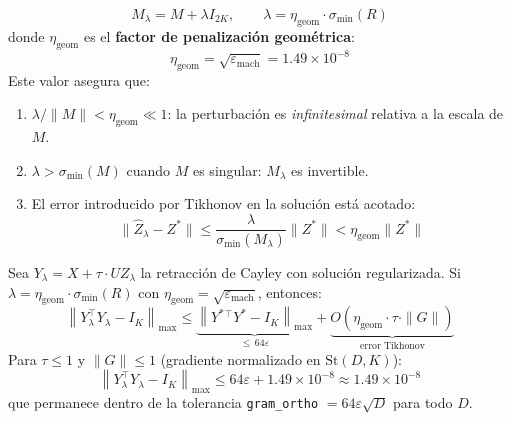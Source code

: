 \begin{equation}
  M_\lambda = M + \lambda I_{2K}, \qquad
  \lambda = \eta_{\text{geom}} \cdot \sigma_{\min}(R)
  
\end{equation}
donde $\eta_{\text{geom}}$ es el \textbf{factor de penalización geométrica}:
\begin{equation}
  \eta_{\text{geom}} = \sqrt{\varepsilon_{\text{mach}}} = 1.49 \times 10^{-8}
\end{equation}
Este valor asegura que:
\begin{enumerate}
  \item $\lambda / \|M\| < \eta_{\text{geom}} \ll 1$: la perturbación es \textit{infinitesimal}
        relativa a la escala de $M$.
  \item $\lambda > \sigma_{\min}(M)$ cuando $M$ es singular: $M_\lambda$ es invertible.
  \item El error introducido por Tikhonov en la solución está acotado:
        \begin{equation}
          \|\hat{Z}_\lambda - Z^*\| \le \frac{\lambda}{\sigma_{\min}(M_\lambda)} \|Z^*\| < \eta_{\text{geom}} \|Z^*\|
        \end{equation}
\end{enumerate}

\begin{theorem}
Sea $Y_\lambda = X + \tau \cdot U Z_\lambda$ la retracción de Cayley con solución regularizada.
Si $\lambda = \eta_{\text{geom}} \cdot \sigma_{\min}(R)$ con $\eta_{\text{geom}} = \sqrt{\varepsilon_{\text{mach}}}$,
entonces:
\begin{equation}
  \left\| Y_\lambda^\top Y_\lambda - I_K \right\|_{\max} \le
  \underbrace{\left\| Y^*{}^\top Y^* - I_K \right\|_{\max}}_{\le\, 64\varepsilon}
  + \underbrace{O(\eta_{\text{geom}} \cdot \tau \cdot \|G\|)}_{\text{error Tikhonov}}
\end{equation}
Para $\tau \le 1$ y $\|G\| \le 1$ (gradiente normalizado en $\mathrm{St}(D,K)$):
\begin{equation}
  \left\| Y_\lambda^\top Y_\lambda - I_K \right\|_{\max}
  \le 64\varepsilon + 1.49 \times 10^{-8} \approx 1.49 \times 10^{-8}
\end{equation}
que permanece dentro de la tolerancia \texttt{gram\_ortho} $= 64\varepsilon\sqrt{D}$ para todo $D$.
\end{theorem}

